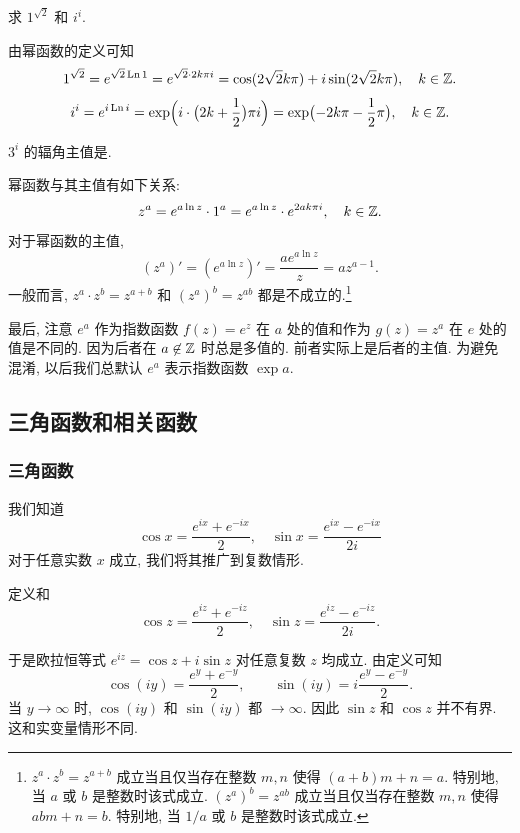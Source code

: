 \begin{example}
  求 $1^{\sqrt 2}$ 和 $i^i$.
\end{example}
\begin{solution}
  由幂函数的定义可知
  \[
    1^{\sqrt2}=e^{\sqrt2\operatorname{Ln}1}
      =e^{\sqrt 2\cdot 2k\pi i}
      =\cos(2\sqrt 2k\pi)+i\sin(2\sqrt 2k\pi), \quad k\in{\mathbb{Z}}.
  \]
  \[
    i^i=e^{i\operatorname{Ln} i}
      =\exp\Bigl(i\cdot\bigl(2k+\frac{1}{2}\bigr)\pi i\Bigr)
      =\exp\bigl(-2k\pi-\frac{1}{2}\pi\bigr), \quad k\in{\mathbb{Z}}.
  \]
\end{solution}

\begin{exercise}
  $3^i$ 的辐角主值是\fillblank{}.
\end{exercise}

幂函数与其主值有如下关系:
\[
  z^a=e^{a\ln z}\cdot 1^a
    =e^{a\ln z}\cdot e^{2ak\pi i},\quad k\in{\mathbb{Z}}.
\]
对于幂函数的主值,
\[
  (z^a)'=(e^{a\ln z})'=\frac{ae^{a\ln z}}z=az^{a-1}.
\]
一般而言, $z^a\cdot z^b=z^{a+b}$ 和 $(z^a)^b=z^{ab}$ 都是不成立的.\footnote{%
  $z^a\cdot z^b=z^{a+b}$ 成立当且仅当存在整数 $m,n$ 使得 $(a+b)m+n=a$.
  特别地, 当 $a$ 或 $b$ 是整数时该式成立.
  $(z^a)^b=z^{ab}$ 成立当且仅当存在整数 $m,n$ 使得 $abm+n=b$.
  特别地, 当 $1/a$ 或 $b$ 是整数时该式成立.
}

最后, 注意 $e^a$ 作为指数函数 $f(z)=e^z$ 在 $a$ 处的值和作为 $g(z)=z^a$ 在 $e$ 处的值是\alert{不同}的.
因为后者在 $a\not\in{\mathbb{Z}}$ 时总是多值的.
前者实际上是后者的主值.
为避免混淆, 以后我们总\alert{默认 $e^a$ 表示指数函数 $\exp a$}.


\subsection{三角函数和相关函数}

\subsubsection{三角函数}

我们知道
  \[
    \cos x=\frac{e^{ix}+e^{-ix}}2,\quad
    \sin x=\frac{e^{ix}-e^{-ix}}{2i}
  \]
对于任意实数 $x$ 成立,
我们将其推广到复数情形.

\begin{definition}
  定义和
  \[
    \cos z=\frac{e^{iz}+e^{-iz}}2,\quad
    \sin z=\frac{e^{iz}-e^{-iz}}{2i}.
  \]
\end{definition}

于是欧拉恒等式 \alert{$e^{iz}=\cos z+i\sin z$ 对任意复数 $z$ 均成立}.
由定义可知
\[
  \cos(iy)=\dfrac{e^y+e^{-y}}2,\qquad
  \sin(iy)=i\dfrac{e^y-e^{-y}}2.
\]
当 $y\to\infty$ 时, $\cos(iy)$ 和 $\sin(iy)$ 都 $\to\infty$.
因此 \alert{$\sin z$ 和 $\cos z$ 并不有界}. 
这和实变量情形不同.

